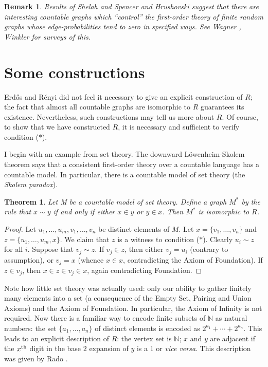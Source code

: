 \documentclass{book}
\newtheorem{theorem}{Theorem}
\newtheorem{remark}{Remark}
\begin{document}
\begin{remark}\rm
Results of Shelah and Spencer
\cite{ch32:bib47} and Hrushovski \cite{ch32:bib31} suggest that
there are interesting countable graphs which ``control'' the
first-order theory of finite random graphs whose edge-probabilities
tend to zero in specified ways. See Wagner \cite{ch32:bib54},
Winkler \cite{ch32:bib55} for surveys of this.
\end{remark}

\section{Some constructions}%
\label{ch32:sec2.2}

Erd\H{o}s and R\'{e}nyi did not feel it necessary to give an
explicit construction of $R$; the fact that almost all countable
graphs are isomorphic to $R$ guarantees its existence. Nevertheless,
such constructions may tell us more about $R$. Of course, to show
that we have constructed $R$, it is necessary and sufficient to
verify condition ($\ast$).

I begin with an example from set theory. The downward
L\"{o}wenheim-Skolem theorem says that a consistent first-order
theory over a countable language has a countable model. In
particular, there is a countable model of set theory (the
\emph{Skolem paradox}).

\begin{theorem}\label{ch32:them2.1} 
Let M be a countable model of set theory.
Define a graph $M^{\ast}$ by the rule that $x\sim y$ if and only if
either $x\in y$ or $y\in x$. Then $M^{\ast}$ is isomorphic to $R$.
\end{theorem}
\begin{proof}
Let $u_1, \ldots, u_m, v_1, \ldots, v_n$ be
distinct elements of $M$. Let $x = \{v_1,\ldots, v_n\}$ and $z =
\{u_1, \ldots, u_m, x\}$. We claim that $z$ is a witness to
condition ($\ast$). Clearly $u_i\sim z$ for all $i$. Suppose that
$v_j \sim z$. If $v_j \in z$, then either $v_j = u_i$ (contrary to
assumption), or $v_j = x$ (whence $x \in x$, contradicting the Axiom
of Foundation). If $z\in v_j$, then $x \in z \in v_j \in x$, again
contradicting Foundation.
\end{proof}

Note how little set theory was actually used: only our ability to
gather finitely many elements into a set (a consequence of the Empty
Set, Pairing and Union Axioms) and the Axiom of Foundation. In
particular, the Axiom of Infinity is not required. Now there is a
familiar way to encode finite subsets of $\mathbb{N}$ as natural
numbers: the set $\{a_1, \ldots,a_n\}$ of distinct elements is
encoded as $2^{a_1}+ \cdots+ 2^{a_n}$. This leads to an explicit
description of $R$: the vertex set is $\mathbb{N}$; $x$ and $y$ are
adjacent if the $x^{\rm th}$ digit in the base $2$ expansion of $y$ is
a $1$ or \emph{vice versa}. This description was given by Rado
\cite{ch32:bib42}.
\end{document}
